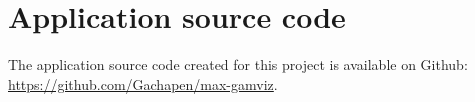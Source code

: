 \section{Application source code}
The application source code created for this project is available on Github: \url{https://github.com/Gachapen/max-gamviz}.
